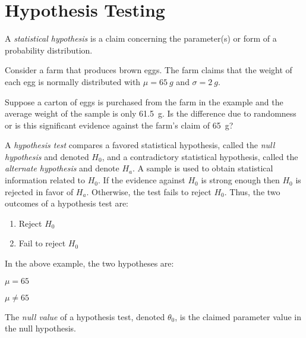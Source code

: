 \documentclass[letterpaper,12pt,fleqn]{article}
\newcommand{\m}{\mu}
\renewcommand{\o}{\sigma}
\renewcommand{\O}{\theta}
\begin{document}
\section*{Hypothesis Testing}

\begin{definition}
  A \emph{statistical hypothesis} is a claim concerning the parameter(s) or form of a probability distribution.
\end{definition}

\begin{example}
  Consider a farm that produces brown eggs.  The farm claims that the weight of each egg is normally distributed with
  \(\m=\SI{65}{g}\) and \(\o=\SI{2}{g}\).
\end{example}

Suppose a carton of eggs is purchased from the farm in the example and the average weight of the sample is only
\SI{61.5}{g}.  Is the difference due to randomness or is this significant evidence against the farm's claim of
\SI{65}{g}?

\begin{definition}
  A \emph{hypothesis test} compares a favored statistical hypothesis, called the \emph{null hypothesis} and denoted \(H_0\),
  and a contradictory statistical hypothesis, called the \emph{alternate hypothesis} and denote \(H_a\).  A sample is used to
  obtain statistical information related to \(H_0\).  If the evidence against \(H_0\) is strong enough then \(H_0\) is
  rejected in favor of \(H_a\).  Otherwise, the test fails to reject \(H_0\).  Thus, the two outcomes of a hypothesis test
  are:
  \begin{enumerate}
  \item Reject \(H_0\)
  \item Fail to reject \(H_0\)
  \end{enumerate}
\end{definition}

\begin{example}
  In the above example, the two hypotheses are:
  \begin{description}[left=0.5in]
  \item[\(H_0\):] \(\m=65\)
  \item[\(H_a\):] \(\m\ne65\)
  \end{description}
\end{example}

\begin{definition}
  The \emph{null value} of a hypothesis test, denoted \(\O_0\), is the claimed parameter value in the null hypothesis.
\end{definition}
\end{document}
